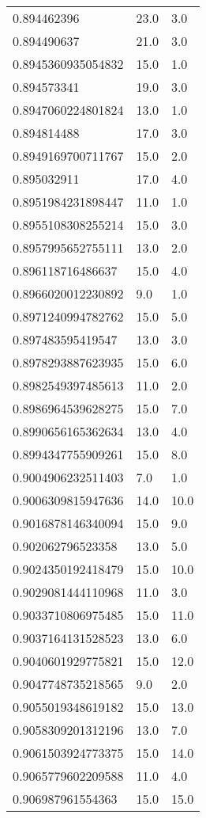 \begin{center}
\begin{supertabular}[H]{p{0.30\textwidth}p{0.05\textwidth}p{0.05\textwidth}}
0.894462396 & 23.0 & 3.0 \\ 
0.894490637 & 21.0 & 3.0 \\ 
0.8945360935054832 & 15.0 & 1.0 \\ 
0.894573341 & 19.0 & 3.0 \\ 
0.8947060224801824 & 13.0 & 1.0 \\ 
0.894814488 & 17.0 & 3.0 \\ 
0.8949169700711767 & 15.0 & 2.0 \\ 
0.895032911 & 17.0 & 4.0 \\ 
0.8951984231898447 & 11.0 & 1.0 \\ 
0.8955108308255214 & 15.0 & 3.0 \\ 
0.8957995652755111 & 13.0 & 2.0 \\ 
0.896118716486637 & 15.0 & 4.0 \\ 
0.8966020012230892 & 9.0 & 1.0 \\ 
0.8971240994782762 & 15.0 & 5.0 \\ 
0.897483595419547 & 13.0 & 3.0 \\ 
0.8978293887623935 & 15.0 & 6.0 \\ 
0.8982549397485613 & 11.0 & 2.0 \\ 
0.8986964539628275 & 15.0 & 7.0 \\ 
0.8990656165362634 & 13.0 & 4.0 \\ 
0.8994347755909261 & 15.0 & 8.0 \\ 
0.9004906232511403 & 7.0 & 1.0 \\ 
0.9006309815947636 & 14.0 & 10.0 \\ 
0.9016878146340094 & 15.0 & 9.0 \\ 
0.902062796523358 & 13.0 & 5.0 \\ 
0.9024350192418479 & 15.0 & 10.0 \\ 
0.9029081444110968 & 11.0 & 3.0 \\ 
0.9033710806975485 & 15.0 & 11.0 \\ 
0.9037164131528523 & 13.0 & 6.0 \\ 
0.9040601929775821 & 15.0 & 12.0 \\ 
0.9047748735218565 & 9.0 & 2.0 \\ 
0.9055019348619182 & 15.0 & 13.0 \\ 
0.9058309201312196 & 13.0 & 7.0 \\ 
0.9061503924773375 & 15.0 & 14.0 \\ 
0.9065779602209588 & 11.0 & 4.0 \\ 
0.906987961554363 & 15.0 & 15.0 \\ 

\end{supertabular}
\end{center}
